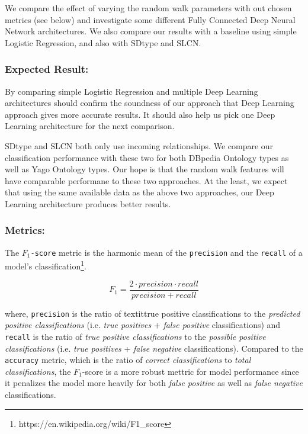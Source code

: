 \documentclass[runningheads,a4paper]{llncs}
\begin{document}
We compare the effect of varying the random walk parameters with out chosen metrics (see below) 
and investigate some different Fully Connected Deep Neural Network
architectures. We also compare our results with a baseline using simple Logistic Regression, 
 and also with SDtype\cite{paulheim2013type} and SLCN\cite{melo2016type}.

\subsubsection{Expected Result:}
By comparing simple Logistic Regression and multiple Deep Learning architectures should confirm the soundness of our approach that Deep Learning approach gives more accurate results. It should also help us pick one Deep Learning architecture for the next comparison.

SDtype\cite{paulheim2013type} and SLCN\cite{melo2016type} both only use incoming relationships. We compare our classification performance with these two for both DBpedia Ontology types as well as Yago Ontology types. Our hope is that the random walk features will have comparable performane to these two approaches. At the least, we expect that using the same available data as the above two approaches, our Deep Learning architecture produces better results.

\subsubsection{Metrics:}
The \texttt{$F_1$-score} metric is the harmonic mean of the \texttt{precision} and the \texttt{recall} of a model's classification\footnote{https://en.wikipedia.org/wiki/F1\_score}. 

\[F_1 = \frac{2 \cdot precision \cdot recall}{precision + recall}\]

where, \texttt{precision} is the ratio of textit{true positive classifications} to the \textit{predicted positive classifications} (i.e. \textit{true positives} + \textit{false positive} classifications) and \texttt{recall} is the ratio of \textit{true positive classifications} to the \textit{possible positive classifications} (i.e. \textit{true positives} + \textit{false negative} classifications). Compared to the \texttt{accuracy} metric, which is the ratio of \textit{correct classifications} to \textit{total classifications}, the $F_1$-score is a more robust mettric for model performance since it penalizes the model more heavily for both \textit{false positive} as well as \textit{false negative} classifications.
\end{document}
